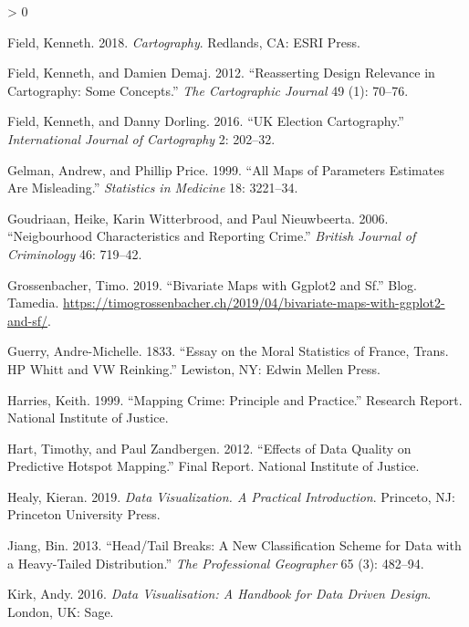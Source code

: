 \documentclass[
]{book}
\newlength{\cslhangindent}
\newenvironment{CSLReferences}[2] %
 {%
  \setlength{\parindent}{0pt}
  \ifodd #1 \everypar{\setlength{\hangindent}{\cslhangindent}}\ignorespaces\fi
  \ifnum #2 > 0
  \setlength{\parskip}{#2\baselineskip}
  \fi
 }%
 {}
\begin{document}
\begin{CSLReferences}{1}{0}
\leavevmode\hypertarget{ref-Field_2018}{}%
Field, Kenneth. 2018. \emph{Cartography}. Redlands, CA: ESRI Press.

\leavevmode\hypertarget{ref-Field_2012}{}%
Field, Kenneth, and Damien Demaj. 2012. {``Reasserting Design Relevance in Cartography: Some Concepts.''} \emph{The Cartographic Journal} 49 (1): 70--76.

\leavevmode\hypertarget{ref-Field_2016}{}%
Field, Kenneth, and Danny Dorling. 2016. {``UK Election Cartography.''} \emph{International Journal of Cartography} 2: 202--32.

\leavevmode\hypertarget{ref-Gelman_1999}{}%
Gelman, Andrew, and Phillip Price. 1999. {``All Maps of Parameters Estimates Are Misleading.''} \emph{Statistics in Medicine} 18: 3221--34.

\leavevmode\hypertarget{ref-Goudriaan_2006}{}%
Goudriaan, Heike, Karin Witterbrood, and Paul Nieuwbeerta. 2006. {``Neigbourhood Characteristics and Reporting Crime.''} \emph{British Journal of Criminology} 46: 719--42.

\leavevmode\hypertarget{ref-Grossenbacher_2019}{}%
Grossenbacher, Timo. 2019. {``Bivariate Maps with Ggplot2 and Sf.''} Blog. Tamedia. \url{https://timogrossenbacher.ch/2019/04/bivariate-maps-with-ggplot2-and-sf/}.

\leavevmode\hypertarget{ref-Guerry_1833}{}%
Guerry, Andre-Michelle. 1833. {``Essay on the Moral Statistics of France, Trans. HP Whitt and VW Reinking.''} Lewiston, NY: Edwin Mellen Press.

\leavevmode\hypertarget{ref-Harries_1999}{}%
Harries, Keith. 1999. {``Mapping Crime: Principle and Practice.''} Research Report. National Institute of Justice.

\leavevmode\hypertarget{ref-Hart_2012}{}%
Hart, Timothy, and Paul Zandbergen. 2012. {``Effects of Data Quality on Predictive Hotspot Mapping.''} Final Report. National Institute of Justice.

\leavevmode\hypertarget{ref-Healy_2019}{}%
Healy, Kieran. 2019. \emph{Data Visualization. A Practical Introduction}. Princeto, NJ: Princeton University Press.

\leavevmode\hypertarget{ref-Jiang_2013}{}%
Jiang, Bin. 2013. {``Head/Tail Breaks: A New Classification Scheme for Data with a Heavy-Tailed Distribution.''} \emph{The Professional Geographer} 65 (3): 482--94.

\leavevmode\hypertarget{ref-Kirk_2016}{}%
Kirk, Andy. 2016. \emph{Data Visualisation: A Handbook for Data Driven Design}. London, UK: Sage.


\end{CSLReferences}
\end{document}
